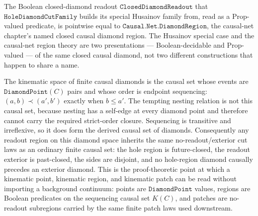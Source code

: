 \begin{theorem}\label{thm:closed-diamond-readout-eq-diamond-region}\leanok{}
The Boolean closed-diamond readout $\texttt{ClosedDiamondReadout}$ that
$\texttt{HoleDiamondCutFamily}$ builds its special Husainov family from, read as a Prop-valued
predicate, is pointwise equal to $\texttt{Causal.Net.DiamondRegion}$, the causal-net chapter's
named closed causal diamond region. The Husainov special case and the causal-net region theory
are two presentations --- Boolean-decidable and Prop-valued --- of the same closed causal
diamond, not two different constructions that happen to share a name.
\end{theorem}

\begin{theorem}\label{thm:hole-diamond-kinematic-space}\leanok{}
The kinematic space of finite causal diamonds is the causal set whose events are
$\texttt{DiamondPoint}(C)$ pairs and whose order is endpoint sequencing:
$(a,b)\prec(a',b')$ exactly when $b\le a'$.  The tempting nesting relation is not this
causal set, because nesting has a self-edge at every diamond point and therefore cannot
carry the required strict-order closure.  Sequencing is transitive and irreflexive, so it
does form the derived causal set of diamonds.  Consequently any readout region on this
diamond space inherits the same no-readout/exterior cut laws as an ordinary finite causal
set: the hole region is future-closed, the readout exterior is past-closed, the sides are
disjoint, and no hole-region diamond causally precedes an exterior diamond.  This is the
proof-theoretic point at which a kinematic point, kinematic region, and kinematic patch can
be read without importing a background continuum: points are \(\texttt{DiamondPoint}\) values,
regions are Boolean predicates on the sequencing causal set \(K(C)\), and patches are
no-readout subregions carried by the same finite patch laws used downstream.
\end{theorem}

